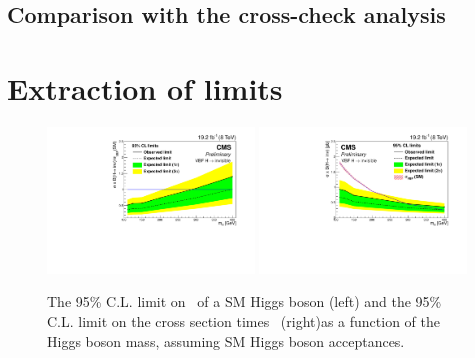 \subsection{Comparison with the cross-check analysis}

\section{Extraction of limits}

\begin{figure}[h!]
  \begin{center}
    \includegraphics[width=0.49\textwidth]{Chapter07/Images/vbflimit.pdf} %
    \includegraphics[width=0.49\textwidth]{Chapter07/Images/vbfxslimit.pdf}
 \caption{The 95\% C.L. limit on \BRinv\, of a SM Higgs
boson (left) and the 95\% C.L. limit on the cross section times
\BRinv\, (right)as a function of the Higgs
boson mass, assuming SM Higgs boson acceptances.}
    \label{fig:limits}
  \end{center}
\end{figure}

